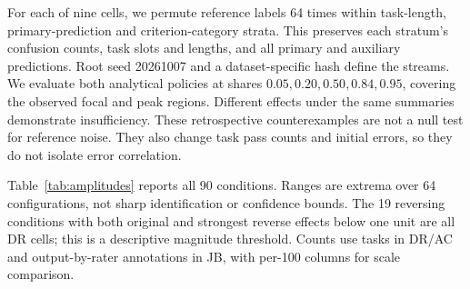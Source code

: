 For each of nine cells, we permute reference labels 64 times within task-length,
primary-prediction and criterion-category strata. This preserves each stratum's
confusion counts, task slots and lengths, and all primary and auxiliary
predictions. Root seed 20261007 and a dataset-specific hash define the streams.
We evaluate both analytical policies at shares $0.05,0.20,0.50,0.84,0.95$,
covering the observed focal and peak regions. Different effects under the same
summaries demonstrate insufficiency. These retrospective counterexamples are
not a null test for reference noise. They also change task pass counts and
initial errors, so they do not isolate error correlation.

Table~\ref{tab:amplitudes} reports all 90 conditions. Ranges are extrema over
64 configurations, not sharp identification or confidence bounds. The 19
reversing conditions with both original and strongest reverse effects below
one unit are all DR cells; this is a descriptive magnitude threshold.
Counts use tasks in DR/AC and output-by-rater annotations in JB, with
per-100 columns for scale comparison.

